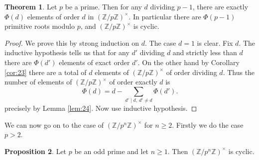 \documentclass{article}
\newcommand{\Z}{\mathbb{Z}}
\newcommand{\rb}[1]{\left( #1 \right)}
\newcommand{\unit}[1]{\rb{\Z / #1\Z}^\times}
\theoremstyle{definition}\newtheorem{definition}{Definition}
\theoremstyle{definition}\newtheorem{remark}[definition]{Remark}
\theoremstyle{definition}\newtheorem*{example}{Example}
\theoremstyle{definition}\newtheorem*{note}{Note}
\newtheorem{proposition}[definition]{Proposition}
\newtheorem{theorem}[definition]{Theorem}
\begin{document}
\begin{theorem}
\label{thm:26}
Let $ p $ be a prime. Then for any $ d $ dividing $ p - 1 $, there are exactly $ \Phi\rb{d} $ elements of order $ d $ in $ \unit{p} $. In particular there are $ \Phi\rb{p - 1} $ primitive roots modulo $ p $, and $ \unit{p} $ is cyclic.
\end{theorem}

\begin{proof}
We prove this by strong induction on $ d $. The case $ d = 1 $ is clear. Fix $ d $. The inductive hypothesis tells us that for any $ d' $ dividing $ d $ and strictly less than $ d $ there are $ \Phi\rb{d'} $ elements of exact order $ d' $. On the other hand by Corollary \ref{cor:23} there are a total of $ d $ elements of $ \unit{p} $ of order dividing $ d $. Thus the number of elements of $ \unit{p} $ of order exactly $ d $ is
$$ \Phi\rb{d} = d - \sum_{d' \mid d, \ d' \ne d} \Phi\rb{d'}. $$
precisely by Lemma \ref{lem:24}. Now use inductive hypothesis.
\end{proof}


We can now go on to the case of $ \unit{p^n} $ for $ n \ge 2 $. Firstly we do the case $ p > 2 $.

\begin{proposition}
\label{prop:26}
Let $ p $ be an odd prime and let $ n \ge 1 $. Then $ \unit{p^n} $ is cyclic.
\end{proposition}
\end{document}
